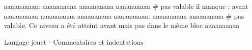\begin{lstfloat}
	\begin{center}
	\begin{pythonlst}
aaaaaaaaaa:
	aaaaaaaaaa
	aaaaaaaaaa
		aaaaaaaaaa # pas valable il manque : avant
		aaaaaaaaaa
	aaaaaaaaaa
aaaaaaaaaa
aaaaaaaaaa:
			aaaaaaaaaa
	aaaaaaaaaa # pas valable. Ce niveau a été atteint avant mais pas dans le même bloc
aaaaaaaaaa
\end{pythonlst}
\caption{\label{list:Comment_Indent}Langage jouet - Commentaires et indentations}
\end{center}
\end{lstfloat}



